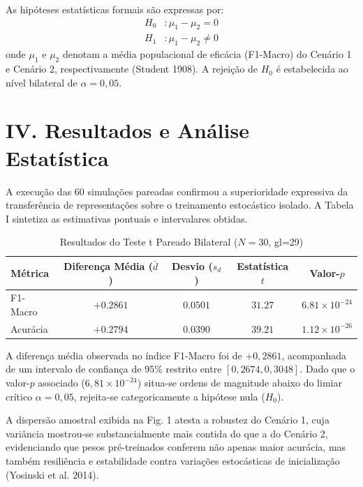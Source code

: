 \documentclass[conference,10pt]{IEEEtran}
\begin{document}
As hipóteses estatísticas formais são expressas por: \[\begin{aligned}
H_0 &: \mu_1 - \mu_2 = 0 \\
H_1 &: \mu_1 - \mu_2 \neq 0
\end{aligned}\] onde \(\mu_1\) e \(\mu_2\) denotam a média populacional
de eficácia (F1-Macro) do Cenário 1 e Cenário 2, respectivamente
(Student 1908). A rejeição de \(H_0\) é estabelecida ao nível bilateral
de \(\alpha = 0{,}05\).

\section{IV. Resultados e Análise
Estatística}\label{iv.-resultados-e-anuxe1lise-estatuxedstica}

A execução das 60 simulações pareadas confirmou a superioridade
expressiva da transferência de representações sobre o treinamento
estocástico isolado. A Tabela I sintetiza as estimativas pontuais e
intervalares obtidas.

\begin{table}[htbp]
\caption{Resultados do Teste t Pareado Bilateral ($N=30$, gl=29)}
\begin{center}
\begin{tabular}{lcccc}
\toprule
\textbf{Métrica} & \textbf{Diferença Média ($\bar{d}$)} & \textbf{Desvio ($s_d$)} & \textbf{Estatística $t$} & \textbf{Valor-$p$} \\
\midrule
F1-Macro & $+0.2861$ & $0.0501$ & $31.27$ & $6.81 \times 10^{-24}$ \\
Acurácia & $+0.2794$ & $0.0390$ & $39.21$ & $1.12 \times 10^{-26}$ \\
\bottomrule
\end{tabular}
\end{center}
\end{table}

A diferença média observada no índice F1-Macro foi de \(+0{,}2861\),
acompanhada de um intervalo de confiança de \(95\%\) restrito entre
\([0{,}2674, 0{,}3048]\). Dado que o valor-\(p\) associado
(\(6{,}81 \times 10^{-24}\)) situa-se ordens de magnitude abaixo do
limiar crítico \(\alpha = 0{,}05\), rejeita-se categoricamente a
hipótese nula (\(H_0\)).

A dispersão amostral exibida na Fig. 1 atesta a robustez do Cenário 1,
cuja variância mostrou-se substancialmente mais contida do que a do
Cenário 2, evidenciando que pesos pré-treinados conferem não apenas
maior acurácia, mas também resiliência e estabilidade contra variações
estocásticas de inicialização (Yosinski et al. 2014).
\end{document}

